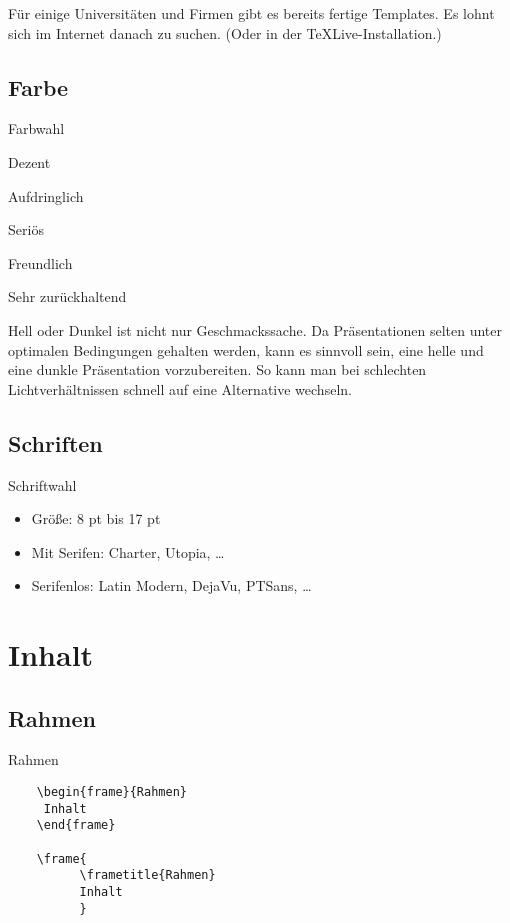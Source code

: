 \documentclass{beamer}
\begin{document}
Für einige Universitäten und Firmen gibt es bereits fertige Templates.
Es lohnt sich im Internet danach zu suchen. (Oder in der TeXLive-Installation.)

\subsection{Farbe}
\begin{frame}[label=farbe]{Farbwahl}
   \begin{description}[<*>]
  \item[Spruce]
    Dezent
  \item[Albatross]
    Aufdringlich
  \item[Beetle]
    Seriös
  \item[Crane]
    Freundlich
  \item[Dove]
    Sehr zurückhaltend
  \end{description}
\end{frame}

Hell oder Dunkel ist nicht nur Geschmackssache.
Da Präsentationen selten unter optimalen Bedingungen gehalten werden, 
kann es sinnvoll sein, eine helle und eine dunkle Präsentation vorzubereiten.
So kann man bei schlechten Lichtverhältnissen schnell auf eine Alternative wechseln.

\subsection{Schriften}
\begin{frame}[label=schrift]{Schriftwahl}
   \begin{itemize}[<*>]
  \item
    Größe: 8 pt bis 17 pt
  \item
    Mit Serifen: Charter, Utopia,  \dots
  \item
    Serifenlos: Latin Modern, DejaVu, PTSans, \dots
  \end{itemize}
\end{frame}

\section{Inhalt}
\subsection{Rahmen}
\begin{frame}[label=rahmen1,fragile]{Rahmen}
  \begin{verbatim}
    \begin{frame}{Rahmen}
     Inhalt
    \end{frame}
    
    \frame{
          \frametitle{Rahmen}
          Inhalt
          }
  \end{verbatim}
\end{frame}
\end{document}
